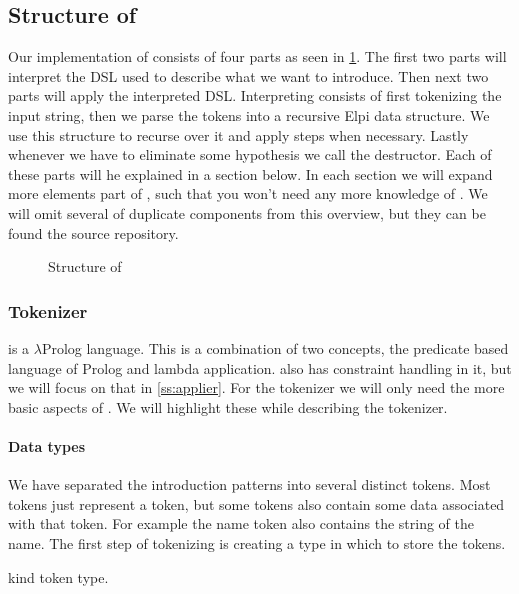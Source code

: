 \documentclass[thesis.tex]{subfiles}
\begin{document}
{{\subsection[Structure of eiIntros]{Structure of }
Our \elpi implementation of  consists of four parts as seen in \cref{fig:eiintrosstruct}. The first two parts will interpret the DSL  used to describe what we want to introduce. Then next two parts will apply the interpreted DSL. Interpreting consists of first tokenizing the input string, then we parse the tokens into a recursive Elpi data structure. We use this structure to recurse over it and apply steps when necessary. Lastly whenever we have to eliminate some hypothesis we call the destructor. Each of these parts will he explained in a section below. In each section we will expand more elements part of \elpi, such that you won't need any more knowledge of \elpi. We will omit several of duplicate components from this overview, but they can be found the source repository.
\begin{figure}
  \centering
  \caption{Structure of }
  \label{fig:eiintrosstruct}
\end{figure}

\subsubsection{Tokenizer}
\elpi is a $\lambda$Prolog language. This is a combination of two concepts, the predicate based language of Prolog and lambda application. \elpi also has constraint handling in it, but we will focus on that in \cref{ss:applier}. For the tokenizer we will only need the more basic aspects of \elpi. We will highlight these while describing the tokenizer.

\paragraph*{Data types}
We have separated the introduction patterns into several distinct tokens. Most tokens just represent a token, but some tokens also contain some data associated with that token. For example the name token also contains the string of the name. The first step of tokenizing is creating a type in which to store the tokens.
\begin{elpicode}
  kind token type.


\end{elpicode}}}
\end{document}
